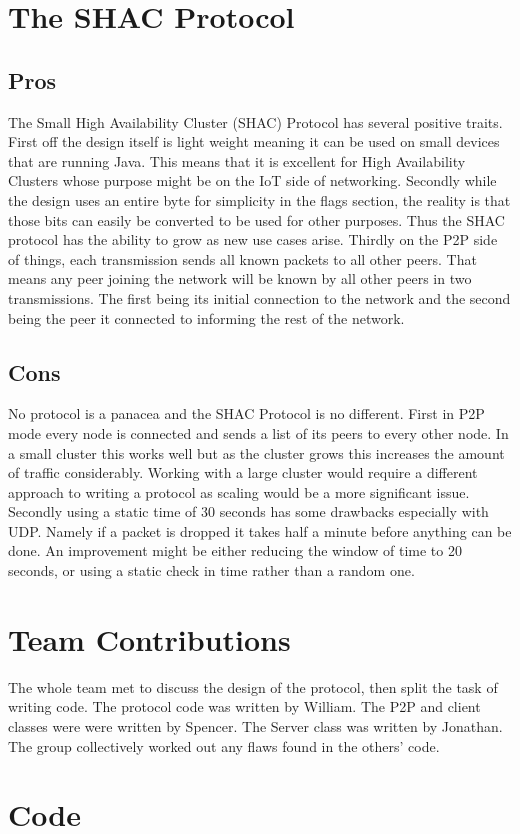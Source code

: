 \documentclass[11pt]{article}
\begin{document}
\begin{doublespace}
\section{The SHAC Protocol}

\subsection{Pros}
The Small High Availability Cluster (SHAC) Protocol has several positive traits. First off the design itself is light weight meaning it can be used on small devices that are running Java. This means that it is excellent for High Availability Clusters whose purpose might be on the IoT side of networking. Secondly while the design uses an entire byte for simplicity in the flags section, the reality is that those bits can easily be converted to be used for other purposes. Thus the SHAC protocol has the ability to grow as new use cases arise. Thirdly on the P2P side of things, each transmission sends all known packets to all other peers. That means any peer joining the network will be known by all other peers in two transmissions. The first being its initial connection to the network and the second being the peer it connected to informing the rest of the network.

\subsection{Cons} 
No protocol is a panacea and the SHAC Protocol is no different. First in P2P mode every node is connected and sends a list of its peers to every other node. In a small cluster this works well but as the cluster grows this increases the amount of traffic considerably. Working with a large cluster would require a different approach to writing a protocol as scaling would be a more significant issue. Secondly using a static time of 30 seconds has some drawbacks especially with UDP. Namely if a packet is dropped it takes half a minute before anything can be done. An improvement might be either reducing the window of time to 20 seconds, or using a static check in time rather than a random one. 

\section{Team Contributions}

The whole team met to discuss the design of the protocol, then split the task of writing code.
The protocol code was written by William.
The P2P and client classes were were written by Spencer.
The Server class was written by Jonathan.
The group collectively worked out any flaws found in the others' code.

\section{Code}
\end{doublespace}
\end{document}
